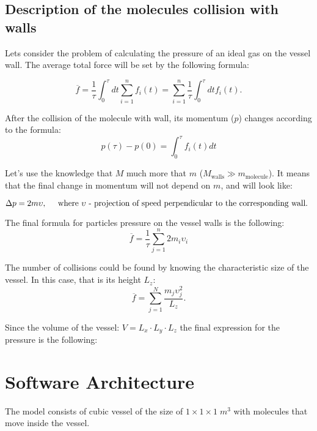 \documentclass[12pt,twoside]{article}
\begin{document}
    \subsection{Description of the molecules collision with walls}
    Lets consider the problem of calculating the pressure of an ideal gas on the vessel wall.
    The average total force will be set by the following formula:

    \begin{equation}
    \overline{f} = \dfrac{1}{\tau} \int_0^\tau dt \sum_{i=1}^n f_i(t) = \sum_{i=1}^n \dfrac{1}{\tau} \int_0^\tau dt f_i(t).
    \end{equation}

    After the collision of the molecule with wall, its momentum ($p$) changes according to the formula:
    \[p(\tau) - p(0) = \int_0^\tau f_i(t) dt \]

    Let's use the knowledge that $M$ much more that $m$ ($M_\text{walls} \gg m_\text{molecule}$).
    It means that the final change in momentum will not depend on $m$, and will look like:

    \begin{equation}
        \Delta p = 2m \upsilon \text{, \; \; where } \upsilon \text{ - projection of speed perpendicular to the
        corresponding wall. }
    \end{equation}

    The final formula for particles pressure on the vessel walls is the following: 
    \begin{equation}
        \overline{f} = \dfrac{1}{\tau} \sum_{j=1}^n 2 m_i \upsilon_i
    \end{equation}

    The number of collisions could be found by knowing the characteristic size of the vessel. In this case, that is its height $L_z$: 
    \[\overline{f} = \sum_{j = 1}^N \dfrac{m_j \upsilon_j^2}{L_z}.\]

    Since the volume of the vessel:  $V = L_x \cdot L_y \cdot L_z$ the final expression for the pressure is the following:

    \begin{center}
    \end{center}

    \section{Software Architecture}
    The model consists of cubic vessel of the size of $ 1 \times 1 \times 1 \; m^{3}$ with molecules that move inside the vessel.
\end{document}
